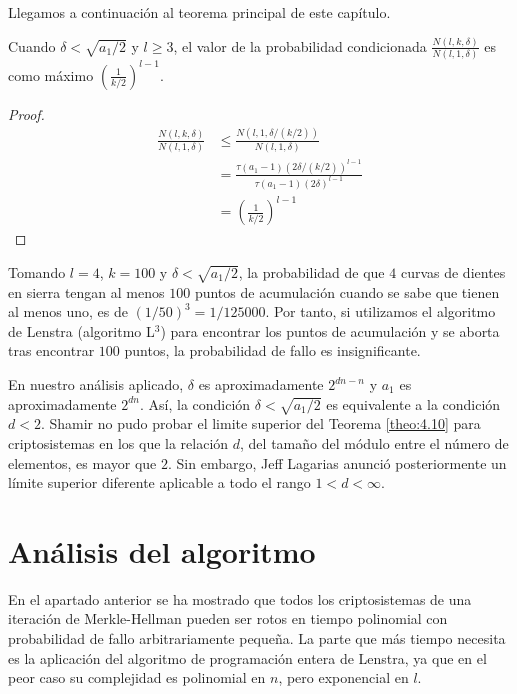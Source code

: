     Llegamos a continuación al teorema principal de este capítulo.

    \begin{teorema} \cite{artSha} \label{theo:4.10}
        Cuando $\delta < \sqrt{a_{1}/2}$ y $l \geq 3$, el valor de la probabilidad condicionada $\frac{N(l, k, \delta)}{N(l, 1, \delta)}$ es como máximo $(\frac{1}{k/2})^{l - 1}$. 
    \end{teorema}

    \begin{proof}
        \begin{align}
           \frac{N(l, k, \delta)}{N(l, 1, \delta)} &\leq \frac{N(l, 1, \delta/(k/2))}{N(l, 1, \delta)} \\
            &= \frac{\tau(a_{1} - 1)(2\delta/(k/2))^{l - 1}}{\tau(a_{1} - 1)(2\delta)^{l - 1}} \\
            &= (\frac{1}{k/2})^{l - 1}
        \end{align}
    \end{proof}

    \begin{ejemplo} \cite{artSha}
        Tomando $l = 4$, $k = 100$ y $\delta < \sqrt{a_{1}/2}$, la probabilidad de que $4$ curvas de dientes en sierra tengan al menos $100$ puntos de acumulación cuando se sabe que tienen al menos uno, es de $(1/50)^{3} = 1/125000$. Por tanto, si utilizamos el algoritmo de Lenstra (algoritmo L$^{3}$) para encontrar los puntos de acumulación y se aborta tras encontrar $100$ puntos, la probabilidad de fallo es insignificante.
    \end{ejemplo}

    En nuestro análisis aplicado, $\delta$ es aproximadamente $2^{dn - n}$ y $a_{1}$ es aproximadamente $2^{dn}$. Así, la condición $\delta < \sqrt{a_{1}/2}$ es equivalente a la condición $d < 2$. Shamir no pudo probar el limite superior del Teorema \ref{theo:4.10} para criptosistemas en los que la relación $d$, del tamaño del módulo entre el número de elementos, es mayor que $2$. Sin embargo, Jeff Lagarias anunció posteriormente un límite superior diferente aplicable a todo el rango $1 < d < \infty$.

    \section{Análisis del algoritmo}

    En el apartado anterior se ha mostrado que todos los criptosistemas de una iteración de Merkle-Hellman pueden ser rotos en tiempo polinomial con probabilidad de fallo arbitrariamente pequeña. La parte que más tiempo necesita es la aplicación del algoritmo de programación entera de Lenstra, ya que en el peor caso su complejidad es polinomial en $n$, pero exponencial en $l$.

